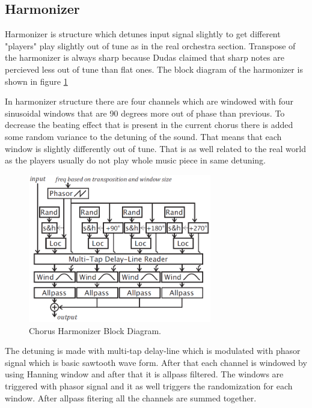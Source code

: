 \subsection{Harmonizer}

Harmonizer is structure which detunes input signal slightly to get different "players" play
slightly out of tune as in the real orchestra section. Transpose of the harmonizer is always sharp
because Dudas\cite{dudas} claimed that sharp notes are percieved less out of tune than flat ones. 
The block diagram of the harmonizer is shown in figure \ref{fig_harm}

In harmonizer structure there are four channels which are windowed with four sinusoidal windows
that are 90 degrees more out of phase than previous. To decrease the beating effect that is present
in the current chorus there is added some random variance to the detuning of the sound. That means
that each window is slightly differently out of tune. That is as well related to the real world as the players
usually do not play whole music piece in same detuning. \cite{dudas}
\begin{figure}[ht]
\centering
\includegraphics[width = 8cm]{harmonizer.png}
\caption{Chorus Harmonizer Block Diagram. \cite{dudas}}
\label{fig_harm}
\end{figure}

The detuning is made with multi-tap delay-line which is modulated with phasor signal which is basic sawtooth
wave form. After that each channel is windowed by using Hanning window and after that it is allpass filtered.
The windows are triggered with phasor signal and it as well triggers the randomization for each window.
After allpass fitering all the channels are summed together. \cite{dudas}
